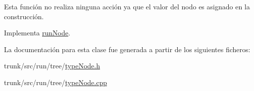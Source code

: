 Esta función no realiza ninguna acción ya que el valor del nodo es asignado en la construcción. 

Implementa \hyperlink{classrunNode_a83c10df8148829b08e04153c93d69eec}{run\-Node}.



La documentación para esta clase fue generada a partir de los siguientes ficheros\-:\begin{DoxyCompactItemize}
\item 
trunk/src/run/tree/\hyperlink{typeNode_8h}{type\-Node.\-h}\item 
trunk/src/run/tree/\hyperlink{typeNode_8cpp}{type\-Node.\-cpp}\end{DoxyCompactItemize}
